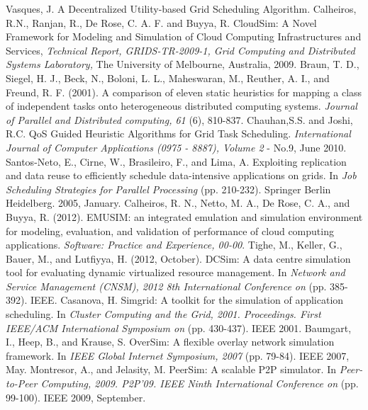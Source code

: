 \documentclass[times, 10pt,twocolumn]{article}
\begin{document}
\begin{thebibliography}{1}

 Vasques, J. A Decentralized Utility-based Grid Scheduling Algorithm.
 Calheiros, R.N., Ranjan, R., De Rose, C. A. F. and Buyya, R. CloudSim: A Novel Framework for Modeling and
 Simulation of Cloud Computing Infrastructures and Services, {\em Technical Report, GRIDS-TR-2009-1, Grid
 Computing and Distributed Systems Laboratory,} The University of Melbourne, Australia, 2009.
 Braun, T. D., Siegel, H. J., Beck, N., Boloni, L. L., Maheswaran, M., Reuther, A. I., and Freund, R. F. (2001). A comparison of eleven static heuristics for mapping a class of independent tasks onto heterogeneous distributed computing systems. {\em Journal of Parallel and Distributed computing, 61} (6), 810-837.
 Chauhan,S.S. and Joshi, R.C. QoS Guided Heuristic Algorithms for Grid Task Scheduling. {\em International Journal of Computer Applications (0975 - 8887), Volume 2} - No.9, June 2010.
 Santos-Neto, E., Cirne, W., Brasileiro, F., and Lima, A. Exploiting replication and data reuse to efficiently schedule data-intensive applications on grids. In {\em Job Scheduling Strategies for Parallel Processing} (pp. 210-232). Springer Berlin Heidelberg. 2005, January.
 Calheiros, R. N., Netto, M. A., De Rose, C. A., and Buyya, R. (2012). EMUSIM: an integrated emulation and simulation environment for modeling, evaluation, and validation of performance of cloud computing applications. {\em Software: Practice and Experience, 00-00}.
 Tighe, M., Keller, G., Bauer, M., and Lutfiyya, H. (2012, October). DCSim: A data centre simulation tool for evaluating dynamic virtualized resource management. In {\em Network and Service Management (CNSM), 2012 8th International Conference on} (pp. 385-392). IEEE.
Casanova, H. Simgrid: A toolkit for the simulation of application scheduling. In {\em Cluster Computing and the Grid, 2001. Proceedings. First IEEE/ACM International Symposium on} (pp. 430-437). IEEE 2001.
Baumgart, I., Heep, B., and Krause, S. OverSim: A flexible overlay network simulation framework. In {\em IEEE Global Internet Symposium, 2007} (pp. 79-84). IEEE 2007, May.
 Montresor, A., and Jelasity, M. PeerSim: A scalable P2P simulator. In {\em Peer-to-Peer Computing, 2009. P2P'09. IEEE Ninth International Conference on} (pp. 99-100). IEEE 2009, September.


\end{thebibliography}
\end{document}
